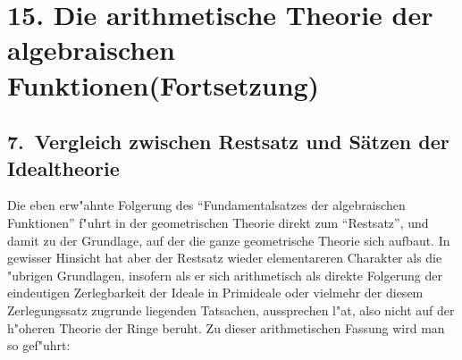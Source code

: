 \documentclass[12pt,a4paper]{article}
\begin{document}
\renewenvironment{noetherpaper}[4]{\newpage\section*{#1}\addcontentsline{toc}{section}{#1}\par\smallskip}{\par\medskip}


\newpage


\section*{15. Die arithmetische Theorie der algebraischen Funktionen\newline\normalsize (Fortsetzung)}

\subsection*{7.\ Vergleich zwischen Restsatz und Sätzen der Idealtheorie}

Die eben erw"ahnte Folgerung des ``Fundamentalsatzes der algebraischen Funktionen'' f"uhrt in der geometrischen Theorie direkt zum ``Restsatz'', und damit zu der Grundlage, auf der die ganze geometrische Theorie sich aufbaut. In gewisser Hinsicht hat aber der Restsatz wieder elementareren Charakter als die "ubrigen Grundlagen, insofern als er sich arithmetisch als direkte Folgerung der eindeutigen Zerlegbarkeit der Ideale in Primideale oder vielmehr der diesem Zerlegungssatz zugrunde liegenden Tatsachen, aussprechen l"at, also nicht auf der h"oheren Theorie der Ringe beruht. Zu dieser arithmetischen Fassung wird man so gef"uhrt:
\end{document}
